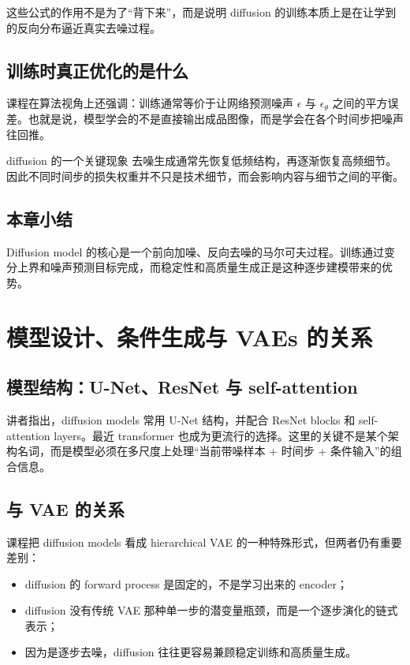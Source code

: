 \documentclass[a4paper]{article}
\begin{document}
这些公式的作用不是为了“背下来”，而是说明 diffusion 的训练本质上是在让学到的反向分布逼近真实去噪过程。

\subsection{训练时真正优化的是什么}

课程在算法视角上还强调：训练通常等价于让网络预测噪声 \(\epsilon\) 与 \(\epsilon_\theta\) 之间的平方误差。也就是说，模型学会的不是直接输出成品图像，而是学会在各个时间步把噪声往回推。

\begin{importantbox}{diffusion 的一个关键现象}
去噪生成通常先恢复低频结构，再逐渐恢复高频细节。因此不同时间步的损失权重并不只是技术细节，而会影响内容与细节之间的平衡。
\end{importantbox}

\subsection{本章小结}

Diffusion model 的核心是一个前向加噪、反向去噪的马尔可夫过程。训练通过变分上界和噪声预测目标完成，而稳定性和高质量生成正是这种逐步建模带来的优势。

\section{模型设计、条件生成与 VAEs 的关系}

\subsection{模型结构：U-Net、ResNet 与 self-attention}

讲者指出，diffusion models 常用 U-Net 结构，并配合 ResNet blocks 和 self-attention layers。最近 transformer 也成为更流行的选择。这里的关键不是某个架构名词，而是模型必须在多尺度上处理“当前带噪样本 + 时间步 + 条件输入”的组合信息。

\subsection{与 VAE 的关系}

课程把 diffusion models 看成 hierarchical VAE 的一种特殊形式，但两者仍有重要差别：
\begin{itemize}
  \item diffusion 的 forward process 是固定的，不是学习出来的 encoder；
  \item diffusion 没有传统 VAE 那种单一步的潜变量瓶颈，而是一个逐步演化的链式表示；
  \item 因为是逐步去噪，diffusion 往往更容易兼顾稳定训练和高质量生成。
\end{itemize}
\end{document}
